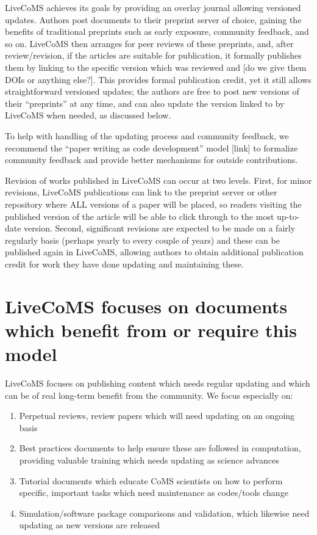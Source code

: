 \documentclass[9pt]{livecoms}
\begin{document}
LiveCoMS achieves its goals by providing an overlay journal allowing versioned updates.
Authors post documents to their preprint server of choice, gaining the benefits of traditional preprints such as early exposure, community feedback, and so on. 
LiveCoMS then arranges for peer reviews of these preprints, and, after review/revision, if the articles are suitable for publication, it formally publishes them by linking to the specific version which was reviewed and [do we give them DOIs or anything else?].
This provides formal publication credit, yet it still allows straightforward versioned updates; the authors are free to post new versions of their ``preprints'' at any time, and can also update the version linked to by LiveCoMS when needed, as discussed below.

To help with handling of the updating process and community feedback, we recommend the ``paper writing as code development'' model [link] to formalize community feedback and provide better mechanisms for outside contributions. 

Revision of works published in LiveCoMS can occur at two levels. 
First, for minor revisions, LiveCoMS publications can link to the preprint server or other repository where ALL versions of a paper will be placed, so readers visiting the published version of the article will be able to click through to the most up-to-date version.
Second, significant revisions are expected to be made on a fairly regularly basis (perhaps yearly to every couple of years) and these can be published again in LiveCoMS, allowing authors to obtain additional publication credit for work they have done updating and maintaining these. 

\section{LiveCoMS focuses on documents which benefit from or require this model}

LiveCoMS focuses on publishing content which needs regular updating and which can be of real long-term benefit from the community.
We focus especially on:
\begin{enumerate}
\item Perpetual reviews, review papers which will need updating on an ongoing basis
\item Best practices documents to help ensure these are followed in computation, providing valuable training which needs updating as science advances
\item Tutorial documents which educate CoMS scientists on how to perform specific, important tasks which need maintenance as codes/tools change
\item Simulation/software package comparisons and validation, which likewise need updating as new versions are released
\end{enumerate}
\end{document}
